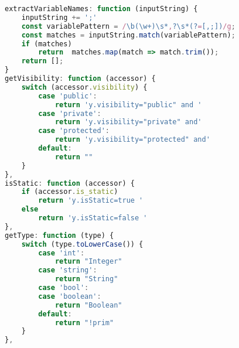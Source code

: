 \begin{lstlisting}[caption={Fall der Class Definition Rule}, label={lst:class_def_rule}, language=javascript]
extractVariableNames: function (inputString) {
    inputString += ';'
    const variablePattern = /\b(\w+)\s*,?\s*(?=[,;])/g;
    const matches = inputString.match(variablePattern);
    if (matches)
        return  matches.map(match => match.trim());
    return [];
}
getVisibility: function (accessor) {
    switch (accessor.visibility) {
        case 'public':
            return 'y.visibility="public" and '
        case 'private':
            return 'y.visibility="private" and'
        case 'protected':
            return 'y.visibility="protected" and'
        default:
            return ""
    }
},
isStatic: function (accessor) {
    if (accessor.is_static)
        return 'y.isStatic=true '
    else
        return 'y.isStatic=false '
},
getType: function (type) {
    switch (type.toLowerCase()) {
        case 'int':
            return "Integer"
        case 'string':
            return "String"
        case 'bool':
        case 'boolean':
            return "Boolean"
        default:
            return "!prim"
    }
},
\end{lstlisting}